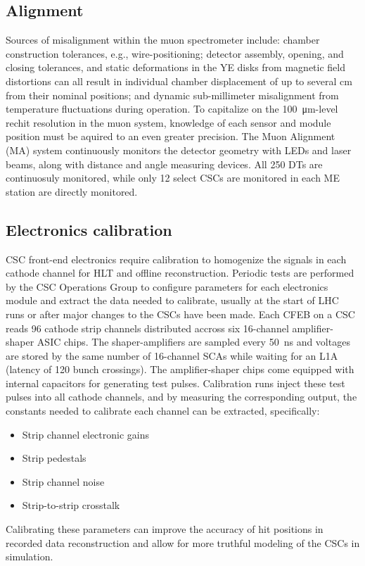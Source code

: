 


\subsection{Alignment}

 Sources of misalignment within the muon spectrometer include: chamber construction tolerances, e.g., wire-positioning; detector assembly, opening, and closing tolerances, and static deformations in the YE disks from magnetic field distortions can all result in individual chamber displacement of up to several cm from their nominal positions; and dynamic sub-millimeter misalignment from temperature fluctuations during operation. To capitalize on the \SI{100}{\micro m}-level rechit resolution in the muon system, knowledge of each sensor and module position must be aquired to an even greater precision. The Muon Alignment (MA) system continuously monitors the detector geometry with LEDs and laser beams, along with distance and angle measuring devices. All 250 DTs are continuosuly monitored, while only 12 select CSCs are monitored in each ME station are directly monitored.


\subsection{Electronics calibration}\label{sec:CSCcalib}

CSC front-end electronics require calibration to homogenize the signals in each cathode channel for HLT and offline reconstruction. Periodic tests are performed by the CSC Operations Group to configure parameters for each electronics module and extract the data needed to calibrate, usually at the start of LHC runs or after major changes to the CSCs have been made. Each CFEB on a CSC reads 96 cathode strip channels distributed accross six 16-channel amplifier-shaper ASIC chips. The shaper-amplifiers are sampled every \SI{50}{ns} and voltages are stored by the same number of 16-channel SCAs while waiting for an L1A (latency of 120 bunch crossings). The amplifier-shaper chips come equipped with internal capacitors for generating test pulses. Calibration runs inject these test pulses into all cathode channels, and by measuring the corresponding output, the constants needed to calibrate each channel can be extracted, specifically:
\begin{itemize}
    \item Strip channel electronic gains
    \item Strip pedestals
    \item Strip channel noise
    \item Strip-to-strip crosstalk
\end{itemize}
Calibrating these parameters can improve the accuracy of hit positions in recorded data reconstruction and allow for more truthful modeling of the CSCs in simulation.

